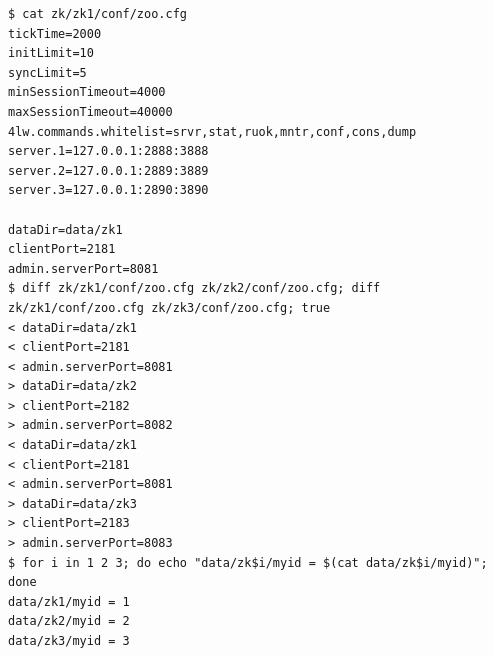 \begin{Verbatim}
$ cat zk/zk1/conf/zoo.cfg
tickTime=2000
initLimit=10
syncLimit=5
minSessionTimeout=4000
maxSessionTimeout=40000
4lw.commands.whitelist=srvr,stat,ruok,mntr,conf,cons,dump
server.1=127.0.0.1:2888:3888
server.2=127.0.0.1:2889:3889
server.3=127.0.0.1:2890:3890

dataDir=data/zk1
clientPort=2181
admin.serverPort=8081
$ diff zk/zk1/conf/zoo.cfg zk/zk2/conf/zoo.cfg; diff zk/zk1/conf/zoo.cfg zk/zk3/conf/zoo.cfg; true
< dataDir=data/zk1
< clientPort=2181
< admin.serverPort=8081
> dataDir=data/zk2
> clientPort=2182
> admin.serverPort=8082
< dataDir=data/zk1
< clientPort=2181
< admin.serverPort=8081
> dataDir=data/zk3
> clientPort=2183
> admin.serverPort=8083
$ for i in 1 2 3; do echo "data/zk$i/myid = $(cat data/zk$i/myid)"; done
data/zk1/myid = 1
data/zk2/myid = 2
data/zk3/myid = 3
\end{Verbatim}
